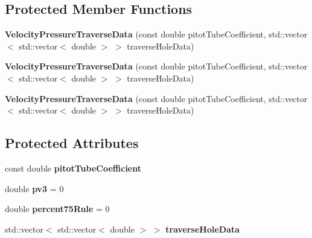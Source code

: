 \subsection*{Protected Member Functions}
\begin{DoxyCompactItemize}
\item 
\mbox{\label{class_velocity_pressure_traverse_data_a7b099c4eb6b034b880aa167d98848c53}} 
{\bfseries Velocity\+Pressure\+Traverse\+Data} (const double pitot\+Tube\+Coefficient, std\+::vector$<$ std\+::vector$<$ double $>$ $>$ traverse\+Hole\+Data)
\item 
\mbox{\label{class_velocity_pressure_traverse_data_a7b099c4eb6b034b880aa167d98848c53}} 
{\bfseries Velocity\+Pressure\+Traverse\+Data} (const double pitot\+Tube\+Coefficient, std\+::vector$<$ std\+::vector$<$ double $>$ $>$ traverse\+Hole\+Data)
\item 
\mbox{\label{class_velocity_pressure_traverse_data_a7b099c4eb6b034b880aa167d98848c53}} 
{\bfseries Velocity\+Pressure\+Traverse\+Data} (const double pitot\+Tube\+Coefficient, std\+::vector$<$ std\+::vector$<$ double $>$ $>$ traverse\+Hole\+Data)
\end{DoxyCompactItemize}
\subsection*{Protected Attributes}
\begin{DoxyCompactItemize}
\item 
\mbox{\label{class_velocity_pressure_traverse_data_a5f0d183ca647bc7eef7f7c7a44a9c23e}} 
const double {\bfseries pitot\+Tube\+Coefficient}
\item 
\mbox{\label{class_velocity_pressure_traverse_data_ae8ed6cb6fa7aeec774383671c38bc21b}} 
double {\bfseries pv3} = 0
\item 
\mbox{\label{class_velocity_pressure_traverse_data_aaae013760883326c1c15bc0e2a27cd34}} 
double {\bfseries percent75\+Rule} = 0
\item 
\mbox{\label{class_velocity_pressure_traverse_data_a02b06c3211e4fb15fdba68127a9855a8}} 
std\+::vector$<$ std\+::vector$<$ double $>$ $>$ {\bfseries traverse\+Hole\+Data}
\end{DoxyCompactItemize}
